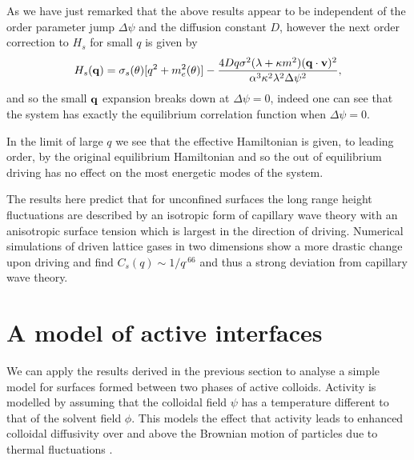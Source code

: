 As we have just remarked  that the above results appear to be independent of the order parameter jump $\Delta \psi$ and the diffusion constant $D$, however the next order correction to $H_s$ for small $q$ is given by
\begin{equation}
H_s({\bf q}) = \sigma_s(\theta) [q^2 + m^2_e(\theta)] - \frac{4Dq \sigma^2(\lambda+\kappa m^2)( {\bf q}\cdot{\bf v})^2 }{\alpha^3 \kappa^2 \lambda^2 \Delta\psi^2},
\end{equation}
and so the small ${\bf q}$ expansion  breaks down at $\Delta\psi=0$, indeed one can see that the system has exactly the equilibrium correlation function when  $\Delta\psi=0$. 

In the limit of large $q$ we see that the effective Hamiltonian is given, to leading order, by the original equilibrium Hamiltonian and so the out of equilibrium driving has no effect on the most energetic modes of the system.

The results here predict that for unconfined surfaces the long range height fluctuations are described by an isotropic form of capillary wave theory with 
an anisotropic surface tension which is largest in the direction of driving. Numerical simulations of driven lattice gases in two dimensions \cite{leun1993} show a more drastic change upon driving and find $C_s(q)\sim  1/q^{.66}$ and thus a strong deviation from capillary wave theory.  
\section{A model of active interfaces}
We can apply the results derived in the previous section to analyse a simple model for
surfaces formed between two phases of active colloids. Activity is modelled by assuming that the colloidal field $\psi$ has a temperature different to that of  the solvent field $\phi$. This models the effect that activity leads to enhanced colloidal diffusivity over and
above the Brownian motion of particles due to thermal fluctuations \cite{gros2015}.

